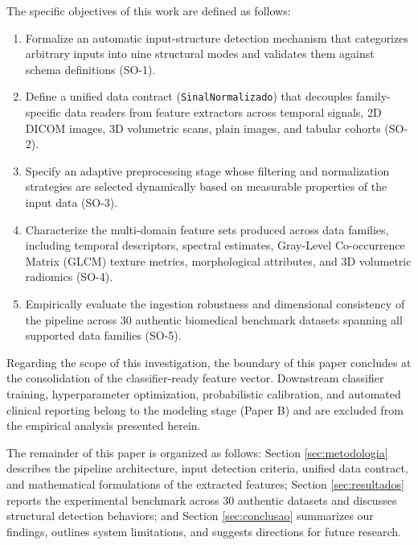 The specific objectives of this work are defined as follows:
\begin{enumerate}
    \item Formalize an automatic input-structure detection mechanism that categorizes arbitrary inputs into nine structural modes and validates them against schema definitions (SO-1).
    \item Define a unified data contract (\texttt{SinalNormalizado}) that decouples family-specific data readers from feature extractors across temporal signals, 2D DICOM images, 3D volumetric scans, plain images, and tabular cohorts (SO-2).
    \item Specify an adaptive preprocessing stage whose filtering and normalization strategies are selected dynamically based on measurable properties of the input data (SO-3).
    \item Characterize the multi-domain feature sets produced across data families, including temporal descriptors, spectral estimates, Gray-Level Co-occurrence Matrix (GLCM) texture metrics, morphological attributes, and 3D volumetric radiomics (SO-4).
    \item Empirically evaluate the ingestion robustness and dimensional consistency of the pipeline across 30 authentic biomedical benchmark datasets spanning all supported data families (SO-5).
\end{enumerate}

Regarding the scope of this investigation, the boundary of this paper concludes at the consolidation of the classifier-ready feature vector. Downstream classifier training, hyperparameter optimization, probabilistic calibration, and automated clinical reporting belong to the modeling stage (Paper B) and are excluded from the empirical analysis presented herein.

The remainder of this paper is organized as follows: Section \ref{sec:metodologia} describes the pipeline architecture, input detection criteria, unified data contract, and mathematical formulations of the extracted features; Section \ref{sec:resultados} reports the experimental benchmark across 30 authentic datasets and discusses structural detection behaviors; and Section \ref{sec:conclusao} summarizes our findings, outlines system limitations, and suggests directions for future research.
